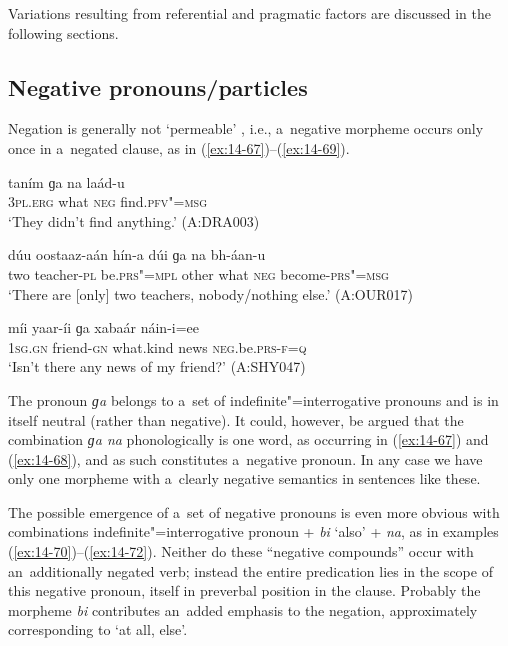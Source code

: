 Variations resulting from referential and pragmatic factors are discussed in the following sections.


\subsection{Negative pronouns/particles}
\label{subsec:14-3-2}

Negation is generally not `permeable' \citep[563]{ramat2006}, i.e., a~negative morpheme occurs only once in a~negated clause, as in (\ref{ex:14-67})--(\ref{ex:14-69}).

\begin{exe}
\ex
\label{ex:14-67}
\gll taním ɡa na laád-u \\
\textsc{3pl.erg} what \textsc{neg} find.\textsc{pfv"=msg}  \\
\glt `They didn't find anything.' (A:DRA003)

\ex
\label{ex:14-68}
\gll dúu oostaaz-aán hín-a dúi ɡa na  bh-áan-u \\
two teacher-\textsc{pl} be.\textsc{prs"=mpl} other what \textsc{neg}  become-\textsc{prs"=msg} \\
\glt `There are [only] two teachers, nobody/nothing else.' (A:OUR017)

\ex
\label{ex:14-69}
\gll míi yaar-íi ɡa xabaár náin-i=ee \\
\textsc{1sg.gn} friend-\textsc{gn} what.kind news \textsc{neg}.be.\textsc{prs-f=q}  \\
\glt `Isn't there any news of my friend?' (A:SHY047)
\end{exe}

The pronoun \textit{ɡa} belongs to a~set of indefinite"=interrogative pronouns and is in itself neutral (rather than negative). It could, however, be argued that the combination \textit{ɡa na} phonologically is one word, as occurring in (\ref{ex:14-67}) and (\ref{ex:14-68}), and as such constitutes a~negative pronoun. In any case we have only one morpheme with a~clearly negative semantics in sentences like these. 



The possible emergence of a~set of negative pronouns is even more obvious with combinations indefinite"=interrogative pronoun + \textit{bi} `also' + \textit{na}, as in examples (\ref{ex:14-70})--(\ref{ex:14-72}). Neither do these ``negative compounds'' occur with an~additionally negated verb; instead the entire predication lies in the scope of this negative pronoun, itself in preverbal position in the clause. Probably the morpheme \textit{bi} contributes an~added emphasis to the negation, approximately corresponding to `at all, else'.

